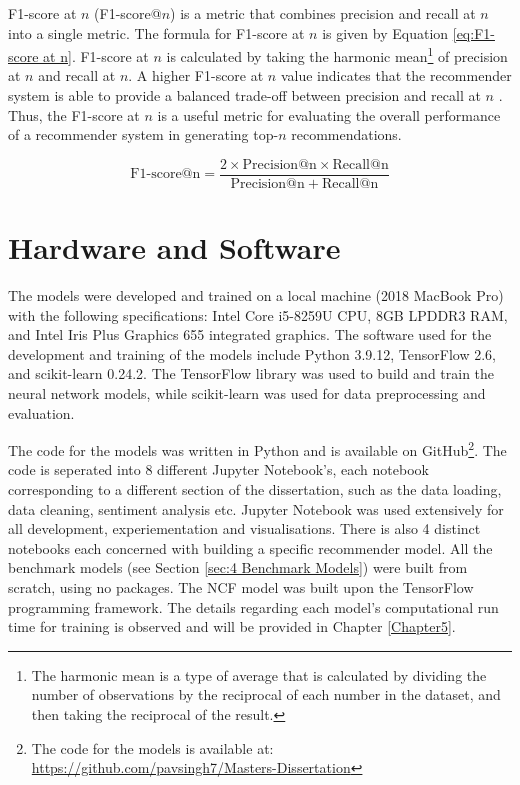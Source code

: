 F1-score at $n$ (F1-score@$n$) is a metric that combines precision and recall at $n$ into a single metric. The formula for F1-score at $n$ is given by Equation \ref{eq:F1-score at n}. F1-score at $n$ is calculated by taking the harmonic mean\footnote{The harmonic mean is a type of average that is calculated by dividing the number of observations by the reciprocal of each number in the dataset, and then taking the reciprocal of the result.} of precision at $n$ and recall at $n$. A higher F1-score at $n$ value indicates that the recommender system is able to provide a balanced trade-off between precision and recall at $n$ \cite{cremonesi2010performance}. Thus, the F1-score at $n$ is a useful metric for evaluating the overall performance of a recommender system in generating top-$n$ recommendations.

\begin{equation}
    \mathrm{F1\text{-}score@n}=\frac{2 \times \mathrm{Precision@n} \times \mathrm{Recall@n}}{\mathrm{Precision@n} + \mathrm{Recall@n}}
    \label{eq:F1-score at n}
\end{equation}


\section{Hardware and Software}  
\label{sec:4 Hardware and Software}

The models were developed and trained on a local machine (2018 MacBook Pro) with the following specifications: Intel Core i5-8259U CPU, 8GB LPDDR3 RAM, and Intel Iris Plus Graphics 655 integrated graphics. The software used for the development and training of the models include Python 3.9.12, TensorFlow 2.6, and scikit-learn 0.24.2. The TensorFlow library was used to build and train the neural network models, while scikit-learn was used for data preprocessing and evaluation. 

The code for the models was written in Python and is available on GitHub\footnote{The code for the models is available at: \url{https://github.com/pavsingh7/Masters-Dissertation}}. The code is seperated into 8 different Jupyter Notebook's, each notebook corresponding to a different section of the dissertation, such as the data loading, data cleaning, sentiment analysis etc. Jupyter Notebook was used extensively for all development, experiementation and visualisations. There is also 4 distinct notebooks each concerned with building a specific recommender model. All the benchmark models (see Section \ref{sec:4 Benchmark Models}) were built from scratch, using no packages. The NCF model was built upon the TensorFlow programming framework. The details regarding each model's computational run time for training is observed and will be provided in Chapter \ref{Chapter5}. 


